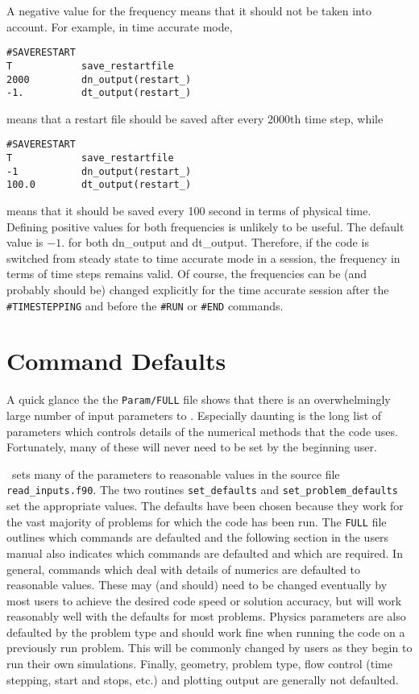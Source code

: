 A negative value for the frequency means that it should not be taken 
into account. For example, in time accurate mode,
\begin{verbatim}
#SAVERESTART
T            save_restartfile
2000         dn_output(restart_)
-1.          dt_output(restart_)
\end{verbatim}
means that a restart file should be saved after every 2000th time step, while
\begin{verbatim}
#SAVERESTART
T            save_restartfile
-1           dn_output(restart_)
100.0        dt_output(restart_)
\end{verbatim}
means that it should be saved every 100 second in terms of physical time.
Defining positive values for both frequencies is unlikely to be useful.
The default value is $-1$. for both dn\_output and dt\_output. Therefore,
if the code is switched from steady state to time accurate mode in a session, 
the frequency in terms of time steps remains valid. Of course, the frequencies
can be (and probably should be) changed explicitly for the time accurate
session after the {\tt \#TIMESTEPPING} and before the {\tt \#RUN}
 or {\tt \#END} commands.


\section{Command Defaults \label{section:defaults}}

A quick glance the the {\tt Param/FULL} file shows that there is an overwhelmingly
large number of input parameters to \BATSRUS.  Especially daunting is the long
list of parameters which controls details of the numerical methods that the
code uses.  Fortunately, many of these will never need to be set by the 
beginning user.  

\BATSRUS\ sets many of the parameters to reasonable values in the source file 
{\tt read\_inputs.f90}.  The two routines
{\tt set\_defaults} and {\tt set\_problem\_defaults} set the appropriate values.
The defaults have been chosen because they work for the vast
majority of problems for which the code has been run.  The {\tt FULL} file outlines
which commands are defaulted and the following section in the users manual
also indicates which commands are defaulted and which are required.  In general,
commands which deal with details of numerics are defaulted to reasonable values.
These may (and should) need to be changed eventually by most users to achieve the
desired code speed or solution accuracy, but will
work reasonably well with the defaults for most problems.
Physics parameters are also defaulted by the problem type and should work fine
when running the code on a previously run problem.  This will be commonly changed
by users as they begin to run their own simulations. Finally, geometry, problem type,
flow control (time stepping, start and stops, etc.) and plotting output 
are generally not defaulted.

